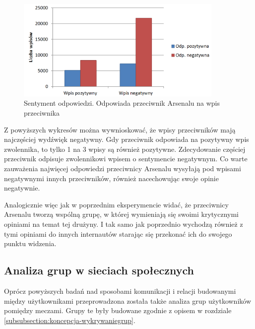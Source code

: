 \begin{figure}[ht!] \centering
\includegraphics[width=100mm]{img/reply-sentiment-przeciwnik-przeciwnik.png}
\caption{Sentyment odpowiedzi. Odpowiada przeciwnik Arsenalu na wpis przeciwnika}
\label{image:reply-sentiment-przeciwnik-przeciwnik}
\end{figure}

Z powyższych wykresów można wywnioskować, że wpisy przeciwników mają najczęściej
wydźwięk negatywny. Gdy przeciwnik odpowiada na pozytywny wpis zwolennika, to tylko
1 na 3 wpisy są również pozytywne. Zdecydowanie częściej przeciwnik odpisuje
zwolennikowi wpisem o sentymencie negatywnym. 
Co warte zauważenia najwięcej odpowiedzi przeciwnicy Arsenalu wysyłają
pod wpisami negatywnymi innych przeciwników, również nacechowując swoje opinie
negatywnie.

Analogicznie więc jak w poprzednim eksperymencie widać, że przeciwnicy
Arsenalu tworzą wspólną grupę, w której wymieniają się swoimi
krytycznymi opiniami na temat tej drużyny. I tak samo jak poprzednio
wychodzą również z tymi opiniami do innych internautów starając się
przekonać ich do swojego punktu widzenia.
















\subsection{Analiza grup w sieciach społecznych}
\label{subsection:strukturagrup}
Oprócz powyższych badań nad sposobami komunikacji i relacji budowanymi między
użytkownikami przeprowadzona została także analiza grup użytkowników 
pomiędzy meczami. Grupy te były budowane zgodnie z
opisem w rozdziale \ref{subsubsection:koncepcja-wykrywaniegrup}.


